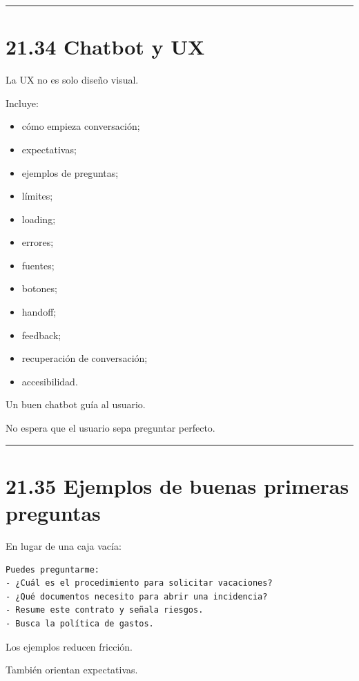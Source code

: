 \begin{center}\rule{0.5\linewidth}{0.5pt}\end{center}

\section{21.34 Chatbot y UX}\label{chatbot-y-ux}

La UX no es solo diseño visual.

Incluye:

\begin{itemize}
\tightlist
\item
  cómo empieza conversación;
\item
  expectativas;
\item
  ejemplos de preguntas;
\item
  límites;
\item
  loading;
\item
  errores;
\item
  fuentes;
\item
  botones;
\item
  handoff;
\item
  feedback;
\item
  recuperación de conversación;
\item
  accesibilidad.
\end{itemize}

Un buen chatbot guía al usuario.

No espera que el usuario sepa preguntar perfecto.

\begin{center}\rule{0.5\linewidth}{0.5pt}\end{center}

\section{21.35 Ejemplos de buenas primeras
preguntas}\label{ejemplos-de-buenas-primeras-preguntas}

En lugar de una caja vacía:

\begin{lstlisting}
Puedes preguntarme:
- ¿Cuál es el procedimiento para solicitar vacaciones?
- ¿Qué documentos necesito para abrir una incidencia?
- Resume este contrato y señala riesgos.
- Busca la política de gastos.
\end{lstlisting}

Los ejemplos reducen fricción.

También orientan expectativas.

